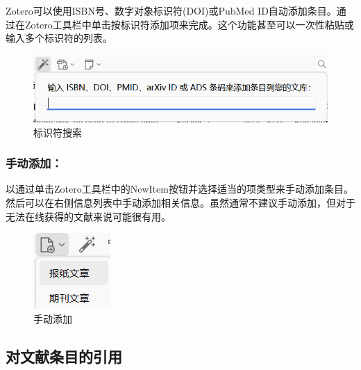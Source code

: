 \documentclass[]{ctexbook}
\theoremstyle{definition}
\theoremstyle{definition}
\theoremstyle{definition}
\theoremstyle{definition}
\theoremstyle{remark}
\begin{document}
Zotero可以使用ISBN号、数字对象标识符(DOI)或PubMed ID自动添加条目。通过在Zotero工具栏中单击按标识符添加项来完成。这个功能甚至可以一次性粘贴或输入多个标识符的列表。

\begin{figure}

{\centering \includegraphics[width=1\linewidth]{img/zotero/zotero_IDsearch} 

}

\caption{标识符搜索}\label{fig:zotero-IDsearch}
\end{figure}

\subsubsection{手动添加：}\label{ux624bux52a8ux6dfbux52a0}

以通过单击Zotero工具栏中的NewItem按钮并选择适当的项类型来手动添加条目。然后可以在右侧信息列表中手动添加相关信息。虽然通常不建议手动添加，但对于无法在线获得的文献来说可能很有用。

\begin{figure}

{\centering \includegraphics[width=0.4\linewidth]{img/zotero/zotero_savebyhand} 

}

\caption{手动添加}\label{fig:zotero-savebyhand}
\end{figure}

\subsection{对文献条目的引用}\label{ux5bf9ux6587ux732eux6761ux76eeux7684ux5f15ux7528}
\end{document}
